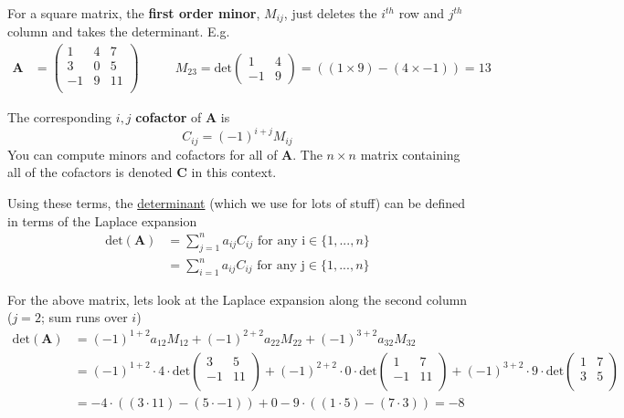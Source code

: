 \documentclass[12pt]{article}
\newcommand{\ve}[1]{\ensuremath{\mathbf{#1}}}
\begin{document}
For a square matrix, the \textbf{first order minor}, $M_{ij}$, just deletes the $i^{th}$ row and $j^{th}$ column and takes the determinant. E.g.
%
\begin{align}
    \ve{A} &= \begin{pmatrix}
        1 & 4 & 7 \\
        3 & 0 & 5 \\
        -1 & 9 & 11 \\
    \end{pmatrix} 
    \qquad
    &M_{23} = \text{det}\begin{pmatrix}
       1 & 4 \\
       -1 & 9 
    \end{pmatrix}   
    = ((1 \times 9) - (4 \times -1)) = 13 \nonumber
\end{align} 

The corresponding $i,j$ \textbf{cofactor} of $\ve{A}$ is
%
\begin{equation}
C_{ij} = (-1)^{i+j} M_{ij} \nonumber
\end{equation}
%
You can compute minors and cofactors for all of $\ve{A}$. The $n \times n$ matrix containing all of the cofactors is denoted $\ve{C}$ in this context.

Using these terms, the \underline{determinant} (which we use for lots of stuff) can be defined in terms of the Laplace expansion
%
\begin{align*}
\text{det}(\ve{A}) &= \sum_{j=1}^n a_{ij} C_{ij} \text{ for any i} \in \{1,...,n\} \\
%
&= \sum_{i=1}^n a_{ij} C_{ij} \text{ for any j} \in \{1,...,n\}
\end{align*}

For the above matrix, lets look at the Laplace expansion along the second column ($j = 2$; sum runs over $i$)
\begin{align}
\text{det}(\ve{A}) &= (-1)^{1+2} a_{12} M_{12} + (-1)^{2+2} a_{22} M_{22} + (-1)^{3+2} a_{32} M_{32} \nonumber \\
%
&= (-1)^{1+2} \cdot 4 \cdot \text{det}\begin{pmatrix}
        3 & 5 \\
        -1 & 11 \\ \end{pmatrix} + (-1)^{2+2} \cdot 0 \cdot \text{det}\begin{pmatrix} 
        1 & 7 \\
        -1 & 11 \\ \end{pmatrix} + (-1)^{3+2} \cdot 9 \cdot \text{det}\begin{pmatrix} 
        1 & 7 \\
        3 & 5 \\\end{pmatrix} \nonumber \\
%
&= -4 \cdot ((3 \cdot 11) - (5 \cdot -1)) + 0 -9 \cdot ((1 \cdot 5) - (7 \cdot 3)) = -8 \nonumber
\end{align}
\end{document}
